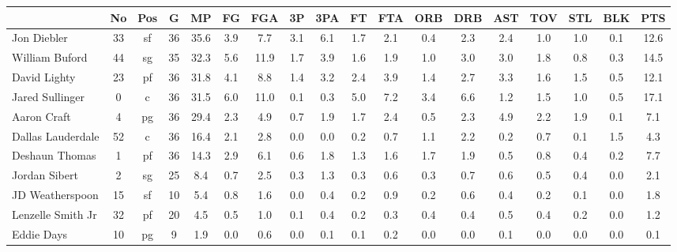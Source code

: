 \documentclass[10pt,letterpaper]{article}
\begin{document}
\begin{table}[ht]
\begin{center}
\begin{tabular}{lccccccccccccccccc}
  \hline
 & No & Pos & G & MP & FG & FGA & 3P & 3PA & FT & FTA & ORB & DRB & AST & TOV & STL & BLK & PTS \\ 
  \hline
Jon Diebler & 33 & sf & 36 & 35.6 & 3.9 & 7.7 & 3.1 & 6.1 & 1.7 & 2.1 & 0.4 & 2.3 & 2.4 & 1.0 & 1.0 & 0.1 & 12.6 \\ 
  William Buford & 44 & sg & 35 & 32.3 & 5.6 & 11.9 & 1.7 & 3.9 & 1.6 & 1.9 & 1.0 & 3.0 & 3.0 & 1.8 & 0.8 & 0.3 & 14.5 \\ 
  David Lighty & 23 & pf & 36 & 31.8 & 4.1 & 8.8 & 1.4 & 3.2 & 2.4 & 3.9 & 1.4 & 2.7 & 3.3 & 1.6 & 1.5 & 0.5 & 12.1 \\ 
  Jared Sullinger & 0 & c & 36 & 31.5 & 6.0 & 11.0 & 0.1 & 0.3 & 5.0 & 7.2 & 3.4 & 6.6 & 1.2 & 1.5 & 1.0 & 0.5 & 17.1 \\ 
  Aaron Craft & 4 & pg & 36 & 29.4 & 2.3 & 4.9 & 0.7 & 1.9 & 1.7 & 2.4 & 0.5 & 2.3 & 4.9 & 2.2 & 1.9 & 0.1 & 7.1 \\ 
  Dallas Lauderdale & 52 & c & 36 & 16.4 & 2.1 & 2.8 & 0.0 & 0.0 & 0.2 & 0.7 & 1.1 & 2.2 & 0.2 & 0.7 & 0.1 & 1.5 & 4.3 \\ 
  Deshaun Thomas & 1 & pf & 36 & 14.3 & 2.9 & 6.1 & 0.6 & 1.8 & 1.3 & 1.6 & 1.7 & 1.9 & 0.5 & 0.8 & 0.4 & 0.2 & 7.7 \\ 
  Jordan Sibert & 2 & sg & 25 & 8.4 & 0.7 & 2.5 & 0.3 & 1.3 & 0.3 & 0.6 & 0.3 & 0.7 & 0.6 & 0.5 & 0.4 & 0.0 & 2.1 \\ 
  JD Weatherspoon & 15 & sf & 10 & 5.4 & 0.8 & 1.6 & 0.0 & 0.4 & 0.2 & 0.9 & 0.2 & 0.6 & 0.4 & 0.2 & 0.1 & 0.0 & 1.8 \\ 
  Lenzelle Smith Jr & 32 & pf & 20 & 4.5 & 0.5 & 1.0 & 0.1 & 0.4 & 0.2 & 0.3 & 0.4 & 0.4 & 0.5 & 0.4 & 0.2 & 0.0 & 1.2 \\ 
  Eddie Days & 10 & pg & 9 & 1.9 & 0.0 & 0.6 & 0.0 & 0.1 & 0.1 & 0.2 & 0.0 & 0.0 & 0.1 & 0.0 & 0.0 & 0.0 & 0.1 \\ 
   \hline
\end{tabular}
\end{center}
\end{table}
\end{document}
